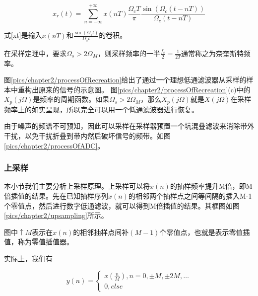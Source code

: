 		\begin{equation}
			{x_r}(t) = \sum\limits_{n =  - \infty }^{ + \infty } {x(nT)\frac{{{\Omega _c}T}}{\pi }} \frac{{\sin ({\Omega _c}(t - nT))}}{{{\Omega _c}(t - nT)}}\label{xt}
		\end{equation}
	
	式\ref{xt}是输入$x(nT)$和$\frac{{\sin \left( {{\Omega _s}t} \right)}}{{{\Omega _s}t}}$的卷积。\par
	
	在采样定理中，要求${\Omega _s} > 2 {\Omega _M}$，则采样频率的一半$\frac{{{f_s}}}{2} = \frac{1}{{2T}}$通常称之为奈奎斯特频率。\par

	图\ref{pics/chapter2/processOfRecreation}给出了通过一个理想低通滤波器从采样的样本中重构出原来的信号的示意图。
	图\ref{pics/chapter2/processOfRecreation}(c)中的${X_p}(j \Omega )$是频率的周期函数。如果${\Omega _s} > 2 {\Omega _M}$，那么${X_p}(j \Omega )$就是$X(j \Omega)$在采样频率上的如实呈现，所以完全可以用一个低通滤波器进行恢复。
	
	由于噪声的频谱不可预知，因此可以采样在采样器预置一个坑混叠滤波来消除带外干扰，以免干扰折叠到带内然后破坏信号的频带。如图\ref{pics/chapter2/processOfADC}。\par
	
	\subsubsection{上采样}\label{sec:upsample}
		本小节我们主要分析上采样原理。上采样可以将$x(n)$的抽样频率提升M倍，即M倍插值的结果。先在已知抽样序列$x(n)$的相邻两个抽样点之间等间隔的插入M-1个零值点，然后进行数字低通滤波，就可以得到M倍插值的结果。其框图如图\ref{pics/chapter2/upsampling}所示。
	
		图中$ \uparrow M$表示在$x(n)$的相邻抽样点间补$(M-1)$个零值点，也就是表示零值插值，称为零值插值器。\par
		实际上，我们有
			 
			 \begin{equation}
				y\left( n \right) = \left\{ \begin{array}{l}
x\left( {\frac{n}{M}} \right),n = 0, \pm M, \pm 2M, \ldots \\
0,else
\end{array} \right.
			\end{equation}
			
